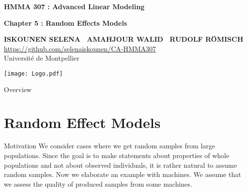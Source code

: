 \documentclass[unknownkeysallowed]{beamer}
\begin{document}



\begin{frame}[noframenumbering]
\thispagestyle{empty}
\bigskip
\bigskip
\begin{center}{
\LARGE\color{marron}
\textbf{HMMA 307 : Advanced Linear Modeling}
\textbf{ }\\
\vspace{0.5cm}
}

\color{marron}
\textbf{Chapter 5 : Random Effects Models}
\end{center}

\vspace{0.5cm}

\begin{center}
\textbf{ISKOUNEN SELENA \ AMAHJOUR WALID \ RUDOLF RÖMISCH } \\
\vspace{0.1cm}
\url{https://github.com/selenaiskounen/CA-HMMA307}\\
\vspace{0.5cm}
Université de Montpellier \\
\end{center}

\centering
\texttt{[image: Logo.pdf]}
\end{frame}

\begin{frame}{Overview} 
	\tableofcontents
\end{frame}

\section{Random Effect Models}
\begin{frame}{Motivation}
We consider cases where we get random samples from large populations. 
Since the goal is to make statements about properties of whole populations and not about observed individuals, it is rather natural to assume random samples. 
Now we elaborate an example with machines. We assume that we assess the quality of produced samples from some machines.

\end{frame}
\end{document}
